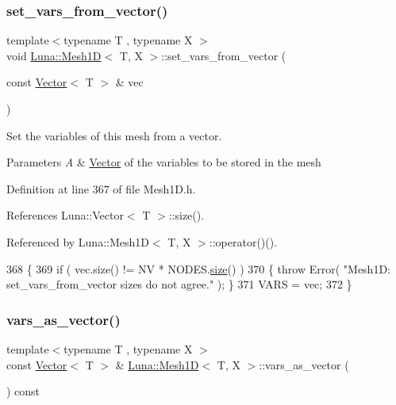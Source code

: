 \subsubsection{\texorpdfstring{set\+\_\+vars\+\_\+from\+\_\+vector()}{set\_vars\_from\_vector()}}
{\footnotesize\ttfamily template$<$typename T , typename X $>$ \\
void \hyperlink{classLuna_1_1Mesh1D}{Luna\+::\+Mesh1D}$<$ T, X $>$\+::set\+\_\+vars\+\_\+from\+\_\+vector (\begin{DoxyParamCaption}\item[{const \hyperlink{classLuna_1_1Vector}{Vector}$<$ T $>$ \&}]{vec }\end{DoxyParamCaption})\hspace{0.3cm}{\ttfamily [inline]}}



Set the variables of this mesh from a vector. 


\begin{DoxyParams}{Parameters}
{\em A} & \hyperlink{classLuna_1_1Vector}{Vector} of the variables to be stored in the mesh \\
\hline
\end{DoxyParams}


Definition at line 367 of file Mesh1\+D.\+h.



References Luna\+::\+Vector$<$ T $>$\+::size().



Referenced by Luna\+::\+Mesh1\+D$<$ T, X $>$\+::operator()().


\begin{DoxyCode}
368   \{
369     \textcolor{keywordflow}{if} ( vec.size() != NV * NODES.\hyperlink{classLuna_1_1Vector_ac9b6ed7a0df401728f27c193fbc8f4d8}{size}() )
370     \{ \textcolor{keywordflow}{throw} Error( \textcolor{stringliteral}{"Mesh1D: set\_vars\_from\_vector sizes do not agree."} ); \}
371     VARS = vec;
372   \}
\end{DoxyCode}
\mbox{\label{classLuna_1_1Mesh1D_a4e867f91a2d0cc0b44c14b97014207ce}} 
\subsubsection{\texorpdfstring{vars\+\_\+as\+\_\+vector()}{vars\_as\_vector()}}
{\footnotesize\ttfamily template$<$typename T , typename X $>$ \\
const \hyperlink{classLuna_1_1Vector}{Vector}$<$ T $>$ \& \hyperlink{classLuna_1_1Mesh1D}{Luna\+::\+Mesh1D}$<$ T, X $>$\+::vars\+\_\+as\+\_\+vector (\begin{DoxyParamCaption}{ }\end{DoxyParamCaption}) const\hspace{0.3cm}{\ttfamily [inline]}}



